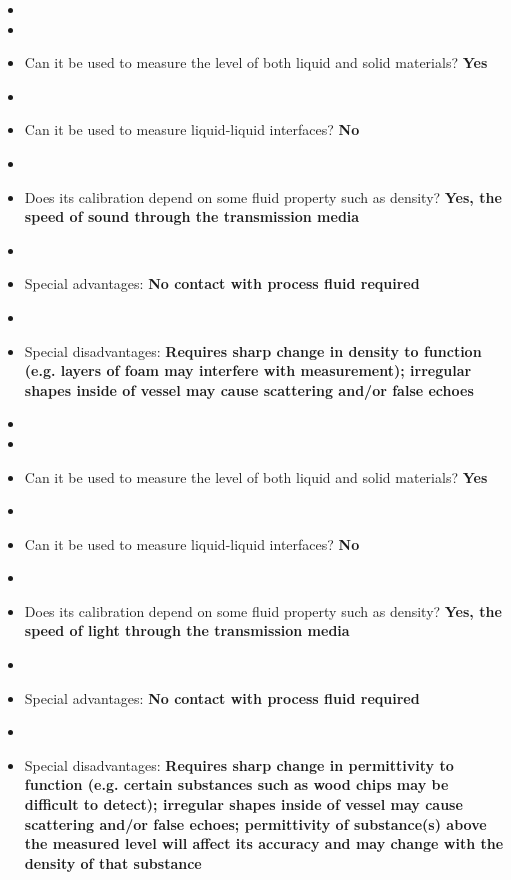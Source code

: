 \begin{itemize}
\goodbreak
\item{} 
\item\item{} Can it be used to measure the level of both liquid and solid materials? {\bf Yes}
\item\item{} Can it be used to measure liquid-liquid interfaces? {\bf No}
\item\item{} Does its calibration depend on some fluid property such as density? {\bf Yes, the speed of sound through the transmission media}
\item\item{} Special advantages: {\bf No contact with process fluid required}
\item\item{} Special disadvantages: {\bf Requires sharp change in density to function (e.g. layers of foam may interfere with measurement); irregular shapes inside of vessel may cause scattering and/or false echoes}
\end{itemize}

\vskip 10pt

\begin{itemize}
\goodbreak
\item{} 
\item\item{} Can it be used to measure the level of both liquid and solid materials? {\bf Yes}
\item\item{} Can it be used to measure liquid-liquid interfaces? {\bf No}
\item\item{} Does its calibration depend on some fluid property such as density? {\bf Yes, the speed of light through the transmission media}
\item\item{} Special advantages: {\bf No contact with process fluid required}
\item\item{} Special disadvantages: {\bf Requires sharp change in permittivity to function (e.g. certain substances such as wood chips may be difficult to detect); irregular shapes inside of vessel may cause scattering and/or false echoes; permittivity of substance(s) above the measured level will affect its accuracy and may change with the density of that substance}
\end{itemize}

